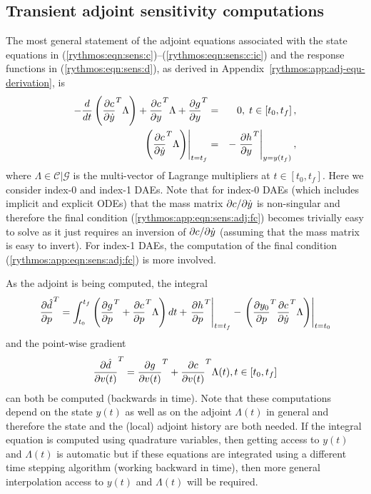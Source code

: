 \documentclass[pdf,ps2pdf,11pt]{SANDreport}
\begin{document}
\subsection{Transient adjoint sensitivity computations}
\label{rythmos:sec:adj-sens}

The most general statement of the adjoint equations associated with the state
equations in (\ref{rythmos:eqn:sens:c})--(\ref{rythmos:eqn:sens:c:ic}) and the
response functions in (\ref{rythmos:eqn:sens:d}), as derived in
Appendix~\ref{rythmos:app:adj-equ-derivation}, is
%
\begin{eqnarray}
- \frac{d}{dt}\left( \displaystyle{\frac{\partial c}{\partial \dot{y}}}^T \Lambda \right)
+  \displaystyle{\frac{\partial c}{\partial y}}^T \Lambda + \displaystyle{\frac{\partial g}{\partial y}}^T
& = & 0, \; t \in \left[ t_0, t_f \right],
\label{rythmos:app:eqn:sens:adj} \\
\left.\left( \displaystyle{\frac{\partial c}{\partial \dot{y}}}^T \Lambda \right)\right|_{t=t_f}
& = & - \left. \displaystyle{\frac{\partial h}{\partial y}}^T \right|_{y=y(t_f)},
\label{rythmos:app:eqn:sens:adj:fc}
\end{eqnarray}
%
where $\Lambda\in\mathcal{C}|\mathcal{G}$ is the multi-vector of Lagrange
multipliers at $t\in[t_0,t_f]$.  Here we consider index-0 and index-1 DAEs.
Note that for index-0 DAEs (which includes implicit and explicit ODEs) that
the mass matrix $\partial c / \partial \dot{y}$ is non-singular and therefore the final
condition (\ref{rythmos:app:eqn:sens:adj:fc}) becomes trivially easy to solve
as it just requires an inversion of $\partial c / \partial \dot{y}$ (assuming that the mass
matrix is easy to invert).  For index-1 DAEs, the computation of the final
condition (\ref{rythmos:app:eqn:sens:adj:fc}) is more involved.

As the adjoint is being computed, the integral
%
\begin{equation}
\displaystyle{\frac{\partial \hat{d}}{\partial p}}^T =
\int_{t_0}^{t_f} \left(
    \displaystyle{\frac{\partial g}{\partial p}}^T
    + \displaystyle{\frac{\partial c}{\partial p}}^T \Lambda
  \right) dt
  + \left. \displaystyle{\frac{\partial h}{\partial p}}^T \right|_{t=t_f}
  - \left. \left( \displaystyle{\frac{\partial y_0}{\partial p}}^T \displaystyle{\frac{\partial c}{\partial \dot{y}}}^T \Lambda \right) \right|_{t=t_0}
\label{rythmos:eqn:sens:d_d_hat_d_p}
\end{equation}
%
and the point-wise gradient
%
%
\begin{equation}
\displaystyle{\frac{\partial \hat{d}}{\partial v(t)}}^T
= \displaystyle{\frac{\partial g}{\partial v(t)}}^T + \displaystyle{\frac{\partial c}{\partial v(t)}}^T \Lambda(t),
t\in[t_0,t_f]
\label{rythmos:eqn:sens:d_d_hat_d_v_t}
\end{equation}
%
can both be computed (backwards in time).  Note that these computations depend
on the state $y(t)$ as well as on the adjoint $\Lambda(t)$ in general and
therefore the state and the (local) adjoint history are both needed.  If the
integral equation is computed using quadrature variables, then getting access
to $y(t)$ and $\Lambda(t)$ is automatic but if these equations are integrated
using a different time stepping algorithm (working backward in time), then
more general interpolation access to $y(t)$ and $\Lambda(t)$ will be required.
\end{document}
